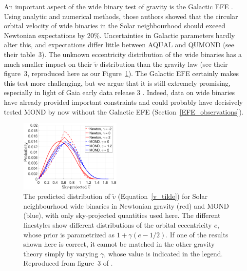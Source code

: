 \documentclass[fleqn,usenatbib,useAMS]{mnras} %
\begin{document}
An important aspect of the wide binary test of gravity is the Galactic EFE \citep{Banik_2018_Centauri}. Using analytic and numerical methods, those authors showed that the circular orbital velocity of wide binaries in the Solar neighbourhood should exceed Newtonian expectations by 20\%. Uncertainties in Galactic parameters hardly alter this, and expectations differ little between AQUAL and QUMOND (see their table~3). The unknown eccentricity distribution of the wide binaries has a much smaller impact on their $\widetilde{v}$ distribution than the gravity law (see their figure~3, reproduced here as our Figure~\ref{Banik_2018_Centauri_Figure_3_sky}). The Galactic EFE certainly makes this test more challenging, but we argue that it is still extremely promising, especially in light of Gaia early data release 3 \citep{Gaia_2021}. Indeed, data on wide binaries have already provided important constraints and could probably have decisively tested MOND by now without the Galactic EFE (Section~\ref{EFE_observations}).

\begin{figure}
	\centering
	\includegraphics[width=0.45\textwidth]{Banik_2018_Centauri_Figure_3_sky}
	\caption{The predicted distribution of $\widetilde{v}$ (Equation~\ref{v_tilde}) for Solar neighbourhood wide binaries in Newtonian gravity (red) and MOND (blue), with only sky-projected quantities used here. The different linestyles show different distributions of the orbital eccentricity $e$, whose prior is parametrized as $1 + \gamma \left(e - 1/2 \right)$. If one of the results shown here is correct, it cannot be matched in the other gravity theory simply by varying $\gamma$, whose value is indicated in the legend. Reproduced from figure~3 of \citet{Banik_2018_Centauri}.}
	\label{Banik_2018_Centauri_Figure_3_sky}
\end{figure}
\end{document}
